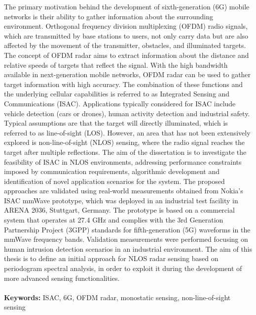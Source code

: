 \documentclass{Configuration_Files/PoliMi3i_thesis}
\begin{document}
The primary motivation behind the development of sixth-generation (6G) mobile networks is their ability to gather information about the surrounding environment. 
Orthogonal frequency division multiplexing (OFDM) radio signals, which are transmitted by base stations to users, not only carry data but
are also affected by the movement of the transmitter, obstacles, and illuminated targets.
The concept of OFDM radar aims to extract information about the distance and relative speeds of targets that reflect the signal.
With the high bandwidth available in next-generation mobile networks, OFDM radar can be used to gather target information with high accuracy. 
The combination of these functions and the underlying cellular capabilities is referred to as Integrated Sensing and Communications (ISAC).
Applications typically considered for ISAC include vehicle detection (cars or drones), human activity detection and industrial safety. 
Typical assumptions are that the target will directly illuminated, which is referred to as line-of-sight (LOS). 
However, an area that has not been extensively explored is non-line-of-sight (NLOS) sensing, where the radio signal reaches the target after multiple reflections.
The aim of the dissertation is to investigate the feasibility of ISAC in NLOS environments, addressing performance constraints imposed by communication requirements, algorithmic development and identification of novel application scenarios for the system.
The proposed approaches are validated using real-world measurements obtained from Nokia's ISAC mmWave prototype, which was deployed in an industrial test facility in ARENA 2036, Stuttgart, Germany.
The prototype is based on a commercial system that operates at 27.4 GHz and complies with the 3rd Generation Partnership Project (3GPP) standards for fifth-generation (5G) waveforms in the mmWave frequency bands. 
Validation measurements were performed focusing on human intrusion detection scenarios in an industrial environment.
The aim of this thesis is to define an initial approach for NLOS radar sensing based on periodogram spectral analysis, in order to exploit it during the development of more advanced sensing functionalities.
\\
\\
\textbf{Keywords:} ISAC, 6G, OFDM radar, monostatic sensing, non-line-of-sight sensing %
\end{document}
